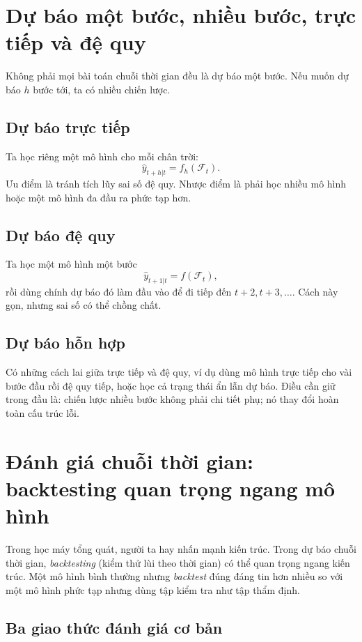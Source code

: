 \section{Dự báo một bước, nhiều bước, trực tiếp và đệ quy}

Không phải mọi bài toán chuỗi thời gian đều là dự báo một bước. Nếu muốn dự báo \(h\) bước tới, ta có nhiều chiến lược.

\subsection{Dự báo trực tiếp}

Ta học riêng một mô hình cho mỗi chân trời:
\[
\hat{y}_{t+h|t}=f_h(\mathcal{F}_t).
\]
Ưu điểm là tránh tích lũy sai số đệ quy. Nhược điểm là phải học nhiều mô hình hoặc một mô hình đa đầu ra phức tạp hơn.

\subsection{Dự báo đệ quy}

Ta học một mô hình một bước
\[
\hat{y}_{t+1|t}=f(\mathcal{F}_t),
\]
rồi dùng chính dự báo đó làm đầu vào để đi tiếp đến \(t+2,t+3,\dots\). Cách này gọn, nhưng sai số có thể chồng chất.

\subsection{Dự báo hỗn hợp}

Có những cách lai giữa trực tiếp và đệ quy, ví dụ dùng mô hình trực tiếp cho vài bước đầu rồi đệ quy tiếp, hoặc học cả trạng thái ẩn lẫn dự báo. Điều cần giữ trong đầu là: chiến lược nhiều bước không phải chi tiết phụ; nó thay đổi hoàn toàn cấu trúc lỗi.

\section{Đánh giá chuỗi thời gian: backtesting quan trọng ngang mô hình}

Trong học máy tổng quát, người ta hay nhấn mạnh kiến trúc. Trong dự báo chuỗi thời gian, \emph{backtesting} (kiểm thử lùi theo thời gian) có thể quan trọng ngang kiến trúc. Một mô hình bình thường nhưng \emph{backtest} đúng đáng tin hơn nhiều so với một mô hình phức tạp nhưng dùng tập kiểm tra như tập thẩm định.

\subsection{Ba giao thức đánh giá cơ bản}

